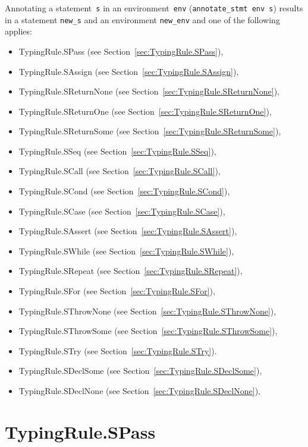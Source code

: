 \documentclass{book}
\begin{document}
\begin{itemize}
Annotating a statement~\texttt{s} in an environment~\texttt{env}
(\texttt{annotate\_stmt env s}) results in a statement \texttt{new\_s} and an
environment \texttt{new\_env} and one of the following applies:
\begin{itemize}
\item TypingRule.SPass (see Section~\ref{sec:TypingRule.SPass}),
\item TypingRule.SAssign (see Section~\ref{sec:TypingRule.SAssign}),
\item TypingRule.SReturnNone (see Section~\ref{sec:TypingRule.SReturnNone}),
\item TypingRule.SReturnOne (see Section~\ref{sec:TypingRule.SReturnOne}),
\item TypingRule.SReturnSome (see Section~\ref{sec:TypingRule.SReturnSome}),
\item TypingRule.SSeq (see Section~\ref{sec:TypingRule.SSeq}),
\item TypingRule.SCall (see Section~\ref{sec:TypingRule.SCall}),
\item TypingRule.SCond (see Section~\ref{sec:TypingRule.SCond}),
\item TypingRule.SCase (see Section~\ref{sec:TypingRule.SCase}),
\item TypingRule.SAssert (see Section~\ref{sec:TypingRule.SAssert}),
\item TypingRule.SWhile (see Section~\ref{sec:TypingRule.SWhile}),
\item TypingRule.SRepeat (see Section~\ref{sec:TypingRule.SRepeat}),
\item TypingRule.SFor (see Section~\ref{sec:TypingRule.SFor}),
\item TypingRule.SThrowNone (see Section~\ref{sec:TypingRule.SThrowNone}),
\item TypingRule.SThrowSome (see Section~\ref{sec:TypingRule.SThrowSome}),
\item TypingRule.STry (see Section~\ref{sec:TypingRule.STry}).
\item TypingRule.SDeclSome (see Section~\ref{sec:TypingRule.SDeclSome}),
\item TypingRule.SDeclNone (see Section~\ref{sec:TypingRule.SDeclNone}),
\end{itemize}

\section{TypingRule.SPass \label{sec:TypingRule.SPass}}


\end{itemize}
\end{document}
